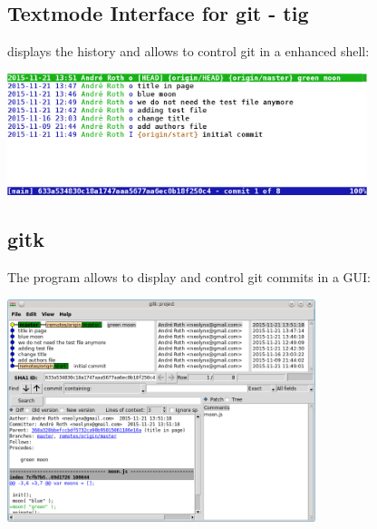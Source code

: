 \subsection{Textmode Interface for git - tig}
\begin{frame}[fragile]
  \subslidetitle
   displays the history and allows to control git in a enhanced shell:
  \newline \vspace{1em}
  \centerline{\includegraphics[width=10.5cm]{../tig_screenshot.png}}
\end{frame}

\subsection{gitk}
\begin{frame}[fragile]
  \subslidetitle
  The program  allows to display and control git commits in a GUI:
  \\
  \vspace{1em}
  \centerline{\includegraphics[width=9cm]{../gitk.png}}
\end{frame}

